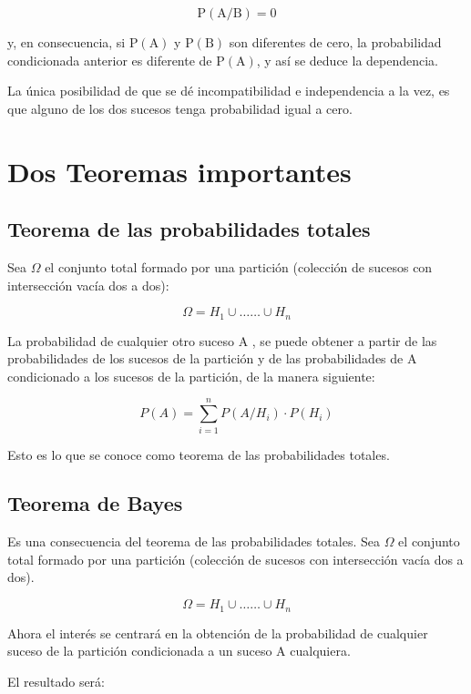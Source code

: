\documentclass[
  a4paper,
  DIV=11,
  numbers=noendperiod]{scrreprt}
\begin{document}
\[
\mathrm{P}(\mathrm{A} / \mathrm{B})=0
\]

y, en consecuencia, si \(\mathrm{P}(\mathrm{A})\) y
\(\mathrm{P}(\mathrm{B})\) son diferentes de cero, la probabilidad
condicionada anterior es diferente de \(\mathrm{P}(\mathrm{A})\), y así
se deduce la dependencia.

La única posibilidad de que se dé incompatibilidad e independencia a la
vez, es que alguno de los dos sucesos tenga probabilidad igual a cero.

\section{Dos Teoremas importantes}\label{dos-teoremas-importantes}

\subsection{Teorema de las probabilidades
totales}\label{teorema-de-las-probabilidades-totales}

Sea \(\Omega\) el conjunto total formado por una partición (colección de
sucesos con intersección vacía dos a dos):

\[
\Omega=H_{1} \cup \ldots \ldots \cup H_{n}
\]

La probabilidad de cualquier otro suceso A , se puede obtener a partir
de las probabilidades de los sucesos de la partición y de las
probabilidades de A condicionado a los sucesos de la partición, de la
manera siguiente:

\[
P(A)=\sum_{i=1}^{n} P\left(A / H_{i}\right) \cdot P\left(H_{i}\right)
\]

Esto es lo que se conoce como teorema de las probabilidades totales.

\subsection{Teorema de Bayes}\label{teorema-de-bayes}

Es una consecuencia del teorema de las probabilidades totales. Sea
\(\Omega\) el conjunto total formado por una partición (colección de
sucesos con intersección vacía dos a dos).

\[
\Omega=H_{1} \cup \ldots \ldots \cup H_{n}
\]

Ahora el interés se centrará en la obtención de la probabilidad de
cualquier suceso de la partición condicionada a un suceso A cualquiera.

El resultado será:
\end{document}
